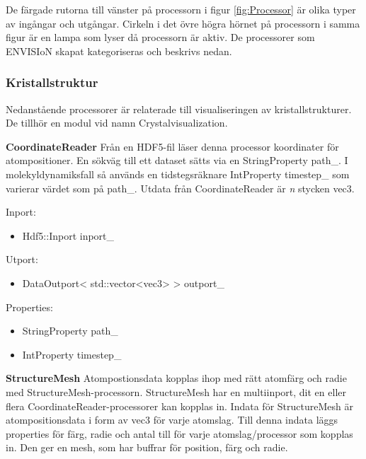 \documentclass[10pt,oneside,swedish]{article}
\providecommand{\tightlist}{%
  \setlength{\itemsep}{0pt}\setlength{\parskip}{0pt}}
\begin{document}
De färgade rutorna till vänster på processorn i figur \ref{fig:Processor} är
olika typer av ingångar och utgångar. Cirkeln i det övre högra hörnet på
processorn i samma figur är en lampa som lyser då processorn är aktiv.
De processorer som ENVISIoN skapat kategoriseras och beskrivs nedan.

\subsubsection{Kristallstruktur}\label{kristallstruktur}

Nedanstående processorer är relaterade till visualiseringen av
kristallstrukturer. De tillhör en modul vid namn Crystalvisualization.

\textbf{CoordinateReader} Från en HDF5-fil läser denna processor
koordinater för atompositioner. En sökväg till ett dataset sätts via en
StringProperty path\_. I molekyldynamiksfall så används en tidstegsräknare IntProperty timestep\_ som varierar värdet som på path\_.
Utdata från CoordinateReader är \emph{n} stycken vec3.

Inport:

\begin{itemize}
\tightlist
\item
  Hdf5::Inport inport\_
\end{itemize}

Utport:

\begin{itemize}
\tightlist
\item
  DataOutport\textless{} std::vector\textless{}vec3\textgreater{}
  \textgreater{} outport\_
\end{itemize}

Properties:

\begin{itemize}
\tightlist
\item
  StringProperty path\_
\item 
  IntProperty timestep\_
\end{itemize}

\textbf{StructureMesh} Atompostionsdata kopplas ihop med rätt atomfärg
och radie med StructureMesh-processorn. StructureMesh har en
multiinport, dit en eller flera CoordinateReader-processorer kan kopplas
in. Indata för StructureMesh är atompositionsdata i form av vec3 för
varje atomslag. Till denna indata läggs properties för färg, radie och
antal till för varje atomslag/processor som kopplas in. Den ger en mesh,
som har buffrar för position, färg och radie.
\end{document}
